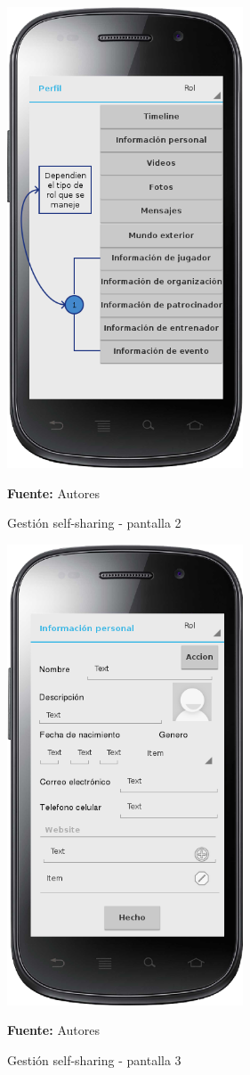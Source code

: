 \begin{figure}[!htb]
  \begin{center}
    \includegraphics[width=7cm]{./imagenes/UI/Self_sharing/self_sharing_2.png}
    \caption{Gestión self-sharing - pantalla 2}
    \label{fig:self_sharing_2}
    \textbf{Fuente:}  Autores
  \end{center}
\end{figure}

\begin{figure}[!htb]
  \begin{center}
    \includegraphics[width=7cm]{./imagenes/UI/Self_sharing/self_sharing_3.png}
    \caption{Gestión self-sharing - pantalla 3}
    \label{fig:self_sharing_3}
    \textbf{Fuente:}  Autores
  \end{center}
\end{figure}

